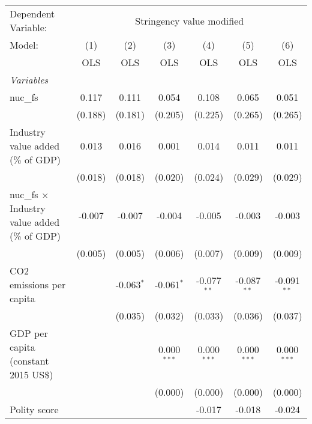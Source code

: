 
\begingroup
\centering
\begin{tabular}{lcccccc}
   \toprule
   Dependent Variable: & \multicolumn{6}{c}{Stringency value modified}\\
   Model:                                               & (1)     & (2)          & (3)           & (4)           & (5)           & (6)\\  
                                                        &  OLS    & OLS          & OLS           & OLS           & OLS           & OLS\\  
   \midrule
   \emph{Variables}\\
   nuc\_fs                                              & 0.117   & 0.111        & 0.054         & 0.108         & 0.065         & 0.051\\   
                                                        & (0.188) & (0.181)      & (0.205)       & (0.225)       & (0.265)       & (0.265)\\   
   Industry value added (\% of GDP)                     & 0.013   & 0.016        & 0.001         & 0.014         & 0.011         & 0.011\\   
                                                        & (0.018) & (0.018)      & (0.020)       & (0.024)       & (0.029)       & (0.029)\\   
   nuc\_fs $\times$ Industry value added (\% of GDP)    & -0.007  & -0.007       & -0.004        & -0.005        & -0.003        & -0.003\\   
                                                        & (0.005) & (0.005)      & (0.006)       & (0.007)       & (0.009)       & (0.009)\\   
   CO2 emissions per capita                             &         & -0.063$^{*}$ & -0.061$^{*}$  & -0.077$^{**}$ & -0.087$^{**}$ & -0.091$^{**}$\\   
                                                        &         & (0.035)      & (0.032)       & (0.033)       & (0.036)       & (0.037)\\   
   GDP per capita (constant 2015 US\$)                  &         &              & 0.000$^{***}$ & 0.000$^{***}$ & 0.000$^{***}$ & 0.000$^{***}$\\   
                                                        &         &              & (0.000)       & (0.000)       & (0.000)       & (0.000)\\   
   Polity score                                         &         &              &               & -0.017        & -0.018        & -0.024\\   

\end{tabular}
